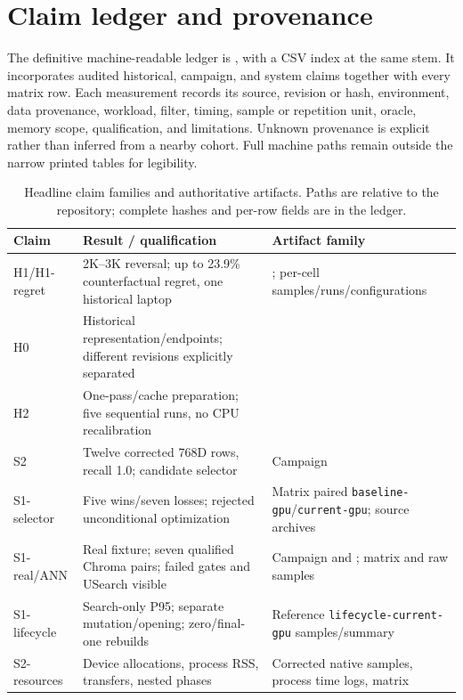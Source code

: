 \section{Claim ledger and provenance}\label{sec:artifact}
The definitive machine-readable ledger is , with a CSV index at the same stem. It incorporates audited historical, campaign, and system claims together with every matrix row. Each measurement records its source, revision or hash, environment, data provenance, workload, filter, timing, sample or repetition unit, oracle, memory scope, qualification, and limitations. Unknown provenance is explicit rather than inferred from a nearby cohort. Full machine paths remain outside the narrow printed tables for legibility.

\begin{table}[H]\centering\small
\caption{Headline claim families and authoritative artifacts. Paths are relative to the repository; complete hashes and per-row fields are in the ledger.}
\begin{tabular}{L{.17\linewidth}L{.37\linewidth}L{.35\linewidth}}
\toprule Claim & Result / qualification & Artifact family \\ \midrule
H1/H1-regret & 2K--3K reversal; up to 23.9\% counterfactual regret, one historical laptop & ; per-cell samples/runs/configurations \\
H0 & Historical representation/endpoints; different revisions explicitly separated &  \\
H2 & One-pass/cache preparation; five sequential runs, no CPU recalibration &  \\
S2 & Twelve corrected 768D rows, recall 1.0; candidate selector & Campaign  \\
S1-selector & Five wins/seven losses; rejected unconditional optimization & Matrix paired \texttt{baseline-gpu}/\texttt{current-gpu}; source archives \\
S1-real/ANN & Real fixture; seven qualified Chroma pairs; failed gates and USearch visible & Campaign  and ; matrix and raw samples \\
S1-lifecycle & Search-only P95; separate mutation/opening; zero/final-one rebuilds & Reference \texttt{lifecycle-current-gpu} samples/summary \\
S2-resources & Device allocations, process RSS, transfers, nested phases & Corrected native samples, process time logs, matrix \\
\bottomrule\end{tabular}\end{table}
